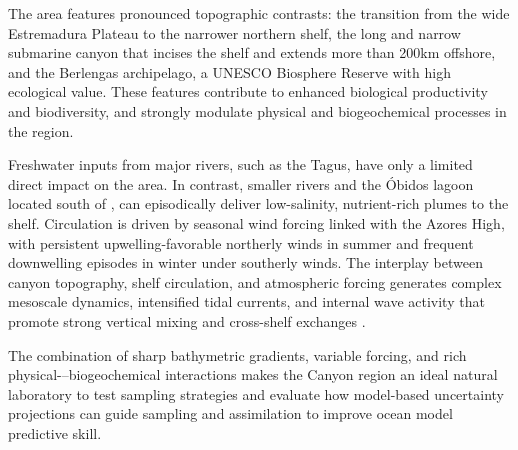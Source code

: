 The \naz area features pronounced topographic contrasts: the
transition from the wide Estremadura Plateau to the narrower northern
shelf, the long and narrow \naz submarine canyon that incises the
shelf and extends more than 200km offshore, and the Berlengas
archipelago, a UNESCO Biosphere Reserve with high ecological
value. These features contribute to enhanced biological productivity
and biodiversity, and strongly modulate physical and biogeochemical
processes in the region.

Freshwater inputs from major rivers, such as the Tagus, have only a
limited direct impact on the area. In contrast, smaller rivers and the
\'{O}bidos lagoon located south of \naze, can episodically deliver
low-salinity, nutrient-rich plumes to the shelf. Circulation is driven
by seasonal wind forcing linked with the Azores High, with persistent
upwelling-favorable northerly winds in summer and frequent downwelling
episodes in winter under southerly winds. The interplay between canyon
topography, shelf circulation, and atmospheric forcing generates
complex mesoscale dynamics, intensified tidal currents, and internal
wave activity that promote strong vertical mixing and cross-shelf
exchanges \parencite{martins10,quaresma07}.

The combination of sharp bathymetric gradients, variable forcing, and
rich physical-–biogeochemical interactions makes the \naz
Canyon region an ideal natural laboratory to test sampling strategies
and evaluate how model-based uncertainty projections can guide
sampling and assimilation to improve ocean model predictive skill.

